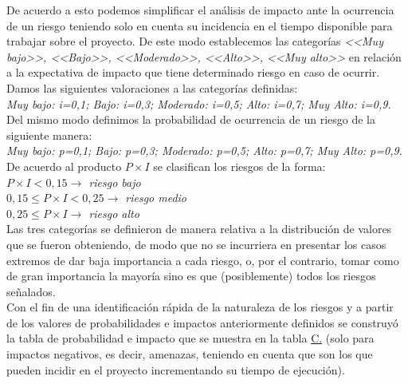 \documentclass[a4paper, 12pt,twoside]{report}  %
\numberwithin{equation}{subsection} %
\begin{document}
De acuerdo a esto podemos simplificar el análisis de impacto ante la ocurrencia de un riesgo teniendo solo en cuenta su incidencia en el tiempo disponible para trabajar sobre el proyecto. De este modo establecemos las categorías \textit{<<Muy bajo>>, <<Bajo>>, <<Moderado>>, <<Alto>>, <<Muy alto>>} en relación a la expectativa de impacto que tiene determinado riesgo en caso de ocurrir. Damos las siguientes valoraciones a las categorías definidas:\\
\textit{Muy bajo: i=0,1; Bajo: i=0,3; Moderado: i=0,5; Alto: i=0,7; Muy Alto: i=0,9.}\\
\indent Del mismo modo definimos la probabilidad de ocurrencia de un riesgo de la siguiente manera:\\
\textit{Muy bajo: p=0,1; Bajo: p=0,3; Moderado: p=0,5; Alto: p=0,7; Muy Alto: p=0,9.}\\
\indent De acuerdo al producto $P \times I$ se clasifican los riesgos de la forma:\\
\indent\textit{$P \times I < 0,15 \rightarrow$ \colorbox{riesgo_bajo}{riesgo bajo}}\\
\indent\textit{$0,15 \leq P \times I<0,25 \rightarrow$ \colorbox{riesgo_medio}{riesgo medio}}\\
\indent\textit{$0,25 \leq P \times I \rightarrow$ \colorbox{riesgo_alto}{riesgo alto}}\\
Las tres categorías se definieron de manera relativa a la distribución de valores que se fueron obteniendo, de modo que no se incurriera en presentar los casos extremos de dar baja importancia a cada riesgo, o, por el contrario, tomar como de gran importancia la mayoría sino es que (posiblemente) todos los riesgos señalados.\\
\indent Con el fin de una identificación rápida de la naturaleza de los riesgos y a partir de los valores de probabilidades e impactos anteriormente definidos se construyó la tabla de probabilidad e impacto que se muestra en la tabla \hyperref[tabla_matriz_prob_impacto]{C.} (solo para impactos negativos, es decir, amenazas, teniendo en cuenta que son los que pueden incidir en el proyecto incrementando su tiempo de ejecución).
\end{document}
